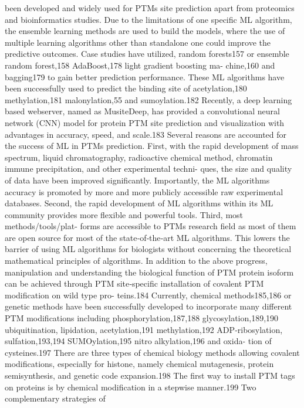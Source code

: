 been developed and widely used for PTMs site prediction apart from proteomics and bioinformatics studies. Due to
the limitations of one specific ML algorithm, the ensemble learning methods are used to build the models, where
the use of multiple learning algorithms other than standalone one could improve the predictive outcomes. Case
studies have utilized, random forests157 or ensemble random forest,158 AdaBoost,178 light gradient boosting ma-
chine,160 and bagging179 to gain better prediction performance. These ML algorithms have been successfully used
to predict the binding site of acetylation,180 methylation,181 malonylation,55 and sumoylation.182 Recently, a deep
learning based webserver, named as MusiteDeep, has provided a convolutional neural network (CNN) model for
protein PTM site prediction and visualization with advantages in accuracy, speed, and scale.183 Several reasons are
accounted for the success of ML in PTMs prediction. First, with the rapid development of mass spectrum, liquid
chromatography, radioactive chemical method, chromatin immune precipitation, and other experimental techni-
ques, the size and quality of data have been improved significantly. Importantly, the ML algorithms accuracy is
promoted by more and more publicly accessible raw experimental databases. Second, the rapid development of ML
algorithms within its ML community provides more flexible and powerful tools. Third, most methods/tools/plat-
forms are accessible to PTMs research field as most of them are open source for most of the state‐of‐the‐art ML
algorithms. This lowers the barrier of using ML algorithms for biologists without concerning the theoretical
mathematical principles of algorithms.
In addition to the above progress, manipulation and understanding the biological function of PTM protein
isoform can be achieved through PTM site‐specific installation of covalent PTM modification on wild type pro-
teins.184 Currently, chemical methods185,186 or genetic methods have been successfully developed to incorporate
many different PTM modifications including phosphorylation,187,188 glycosylation,189,190 ubiquitination, lipidation,
acetylation,191 methylation,192 ADP‐ribosylation, sulfation,193,194 SUMOylation,195 nitro alkylation,196 and oxida-
tion of cysteines.197 There are three types of chemical biology methods allowing covalent modifications, especially
for histone, namely chemical mutagenesis, protein semisynthesis, and genetic code expansion.198 The first way to
install PTM tags on proteins is by chemical modification in a stepwise manner.199 Two complementary strategies of

